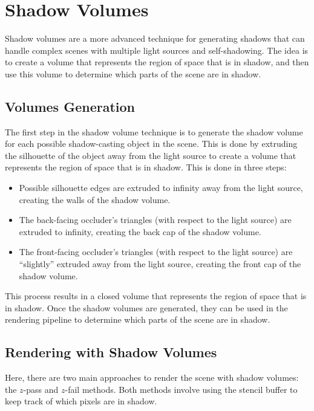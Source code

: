 \section{Shadow Volumes}

Shadow volumes are a more advanced technique for generating shadows that can handle complex scenes with multiple light sources and self-shadowing. The idea is to create a volume that represents the region of space that is in shadow, and then use this volume to determine which parts of the scene are in shadow.

\subsection{Volumes Generation}

The first step in the shadow volume technique is to generate the shadow volume for each possible shadow-casting object in the scene. This is done by extruding the silhouette of the object away from the light source to create a volume that represents the region of space that is in shadow. This is done in three steps:
\begin{itemize}
    \item Possible silhouette edges are extruded to infinity away from the light source, creating the walls of the shadow volume.
    \item The back-facing occluder's triangles (with respect to the light source) are extruded to infinity, creating the back cap of the shadow volume.
    \item The front-facing occluder's triangles (with respect to the light source) are ``slightly'' extruded away from the light source, creating the front cap of the shadow volume.
\end{itemize}

This process results in a closed volume that represents the region of space that is in shadow. Once the shadow volumes are generated, they can be used in the rendering pipeline to determine which parts of the scene are in shadow.

\subsection{Rendering with Shadow Volumes}

Here, there are two main approaches to render the scene with shadow volumes: the $z$-pass and $z$-fail methods. Both methods involve using the stencil buffer to keep track of which pixels are in shadow.

